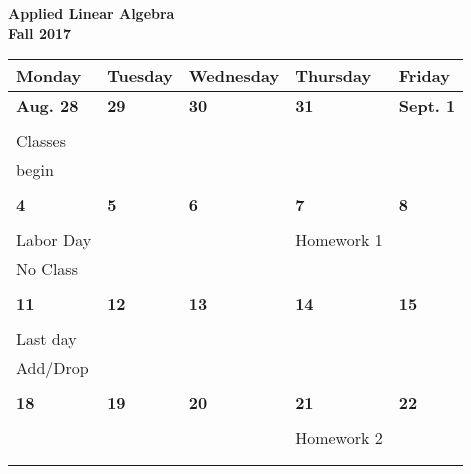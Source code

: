 \documentclass[letter, 12pt]{article}
\begin{document}
\begin{center}\textbf{Applied Linear Algebra}\\
\textbf{Fall 2017}
\end{center}
\begin{center}
\begin{tabular}{|l|l|l|l|l|}
\hline

{\bf \phantom{xx}Monday\phantom{x}}
 & {\bf \phantom{xx}Tuesday\phantom{x}}
 & {\bf \phantom{x}Wednesday\phantom{}}
 & {\bf \phantom{x}Thursday\phantom{x}}
 & {\bf \phantom{xx}Friday\phantom{xx}} \\
\hline


\textbf{Aug. 28} & \textbf{29} & \textbf{30} & \textbf{31} & \textbf{Sept. 1} \\
&  &  &  & \\
%
{\small Classes}&  &  &  & \\
%
{\small begin}&  &  &  & \\
%
&  &  &  & \\
\hline


\textbf{4} & \textbf{5} & \textbf{6} & \textbf{7} & \textbf{8} \\
&  &  &  & \\
%
{\small Labor Day}&  &  & Homework 1 & \\
%
{\small No Class}&  &  &  & \\
%
&  &  &  & \\
\hline



\textbf{11} & \textbf{12} & \textbf{13} & \textbf{14} & \textbf{15} \\
&  &  &  & \\
%
{\small Last day}&  &  &  & \\
%
{\small Add/Drop}&  &  &  & \\
%
&  &  &  & \\
\hline



\textbf{18} & \textbf{19} & \textbf{20} & \textbf{21} & \textbf{22} \\
&  &  &  & \\
%
&  &  &  Homework 2& \\
%
&  &  &  & \\
%
&  &  &  & \\
\hline



\end{tabular}
\end{center}
\end{document}
